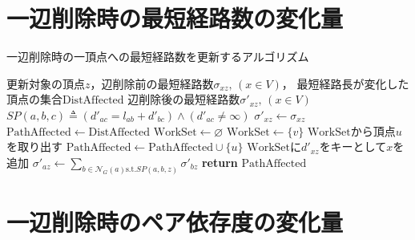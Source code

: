 \section{一辺削除時の最短経路数の変化量}
\label{sect:update-sigma-on-delete}

\begin{algorithm}[H]
  \caption{一辺削除時の一頂点への最短経路数を更新するアルゴリズム}
  \label{algo:update-sigma-on-delete}
  \begin{algorithmic}[1]
    \Require 更新対象の頂点$z$，辺削除前の最短経路数$\sigma_{xz},\,(x\in V)$，
    最短経路長が変化した頂点の集合$\mathrm{DistAffected}$
    \Ensure 辺削除後の最短経路数$\sigma'_{xz},\,(x\in V)$
    \State $SP(a,b,c)\triangleq(d'_{ac}=l_{ab}+d'_{bc})\land(d'_{ac}\neq\infty)$
    \State $\sigma'_{xz}\gets\sigma_{xz}$
    \State $\mathrm{PathAffected}\gets\mathrm{DistAffected}$
    \State $\mathrm{WorkSet}\gets\varnothing$
    \Else
    \State $\mathrm{WorkSet}\gets\{v\}$
    \EndIf
    \State $\mathrm{WorkSet}$から頂点$u$を取り出す
    \State $\mathrm{PathAffected}\gets\mathrm{PathAffected}\cup\{u\}$
    \State $\mathrm{WorkSet}$に$d'_{xz}$をキーとして$x$を追加
    \EndIf
    \EndFor
    \EndWhile
    \State $\sigma'_{az}\gets\sum_{b\in\mathcal{N}_G(a)\mathrm{s.t.}SP(a,b,z)}\sigma'_{bz}$
    \EndFor
    \State \textbf{return} $\mathrm{PathAffected}$
    \EndProcedure
  \end{algorithmic}
\end{algorithm}

\section{一辺削除時のペア依存度の変化量}
\label{sect:update-pd-on-delete}

